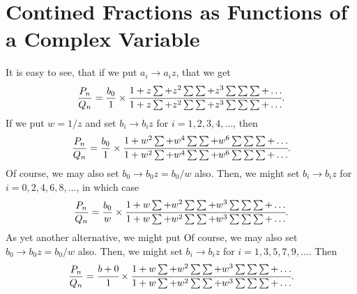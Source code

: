 \documentclass[16pt]{article}
\numberwithin{equation}{section}
\numberwithin{figure}{section}
\numberwithin{figure}{section}
\numberwithin{equation}{section}
\begin{document}
\section{Contined Fractions as Functions of a Complex Variable}

It is easy to see, that if we put $a_i \rightarrow a_i z$, that we get
\begin{equation}
\frac{P_n}{Q_n}=\frac{b_0}{1} \times \cfrac{ 1+z\sum+z^2 \sum \sum +z^3 \sum \sum \sum + \ldots }
                                            { 1+z\sum+z^2 \sum \sum +z^3 \sum \sum \sum + \ldots }.
\end{equation}
If we put $w=1/z$ and set $b_i \rightarrow b_i z$ for $i=1,2,3,4,\ldots$, then 
\begin{equation}
\frac{P_n}{Q_n}=\frac{b_0}{1} \times \cfrac{ 1+w^2 \sum+w^4 \sum \sum +w^6 \sum \sum \sum + \ldots }
                                            { 1+w^2\sum+w^4 \sum \sum +w^6 \sum \sum \sum + \ldots }.
\end{equation}
Of course, we may also set $b_0 \rightarrow b_0 z=b_0/w$ also.
Then, we might set $b_i \rightarrow b_i z$ for $i=0,2,4,6,8, \ldots$, in which case
\begin{equation}
\frac{P_n}{Q_n}=\frac{b_0}{w} \times \cfrac{ 1+w \sum+w^2 \sum \sum +w^3 \sum \sum \sum + \ldots }
                                            { 1+w \sum+w^2 \sum \sum +w^3 \sum \sum \sum + \ldots }.
\end{equation}
As yet another alternative, we might put
Of course, we may also set $b_0 \rightarrow b_0 z=b_0/w$ also.
Then, we might set $b_i \rightarrow b_i z$ for $i=1,3,5,7,9, \ldots$.
Then
\begin{equation}
\frac{P_n}{Q_n}=\cfrac{b+0}{1} \times \cfrac{ 1+w \sum+w^2 \sum \sum +w^3 \sum \sum \sum + \ldots }
                                            { 1+w \sum+w^2 \sum \sum +w^3 \sum \sum \sum + \ldots }.
\end{equation}
\end{document}
